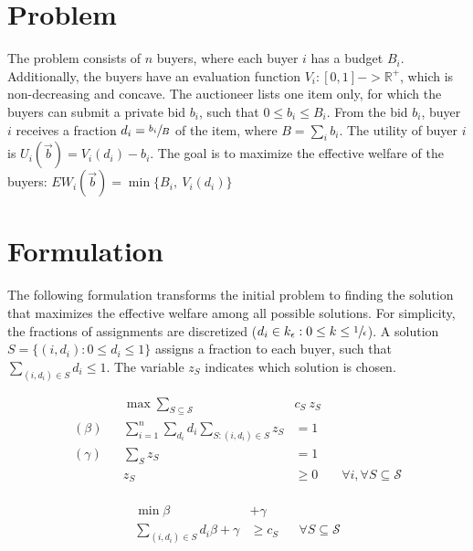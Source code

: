 \documentclass[11pt,a4paper]{article}
\begin{document}
\section{Problem}

The problem consists of $n$ buyers, where each buyer $i$ has a budget $B_i$. Additionally, the buyers have an evaluation function $V_i : [0,1] -> \mathbb{R}^+$, which is non-decreasing and concave. The auctioneer lists one item only, for which the buyers can submit a private bid $b_i$, such that $0 \le b_i \le B_i$. From the bid $b_i$, buyer $i$ receives a fraction $d_i = \sfrac{b_i}{B}$ of the item, where $B = \sum_i b_i$. The utility of buyer $i$ is $U_i(\vec{b}) = V_i(d_i) - b_i$. The goal is to maximize the effective welfare of the buyers: $EW_i(\vec{b}) = \min\{B_i,\ V_i(d_i)\}$

\section{Formulation}

The following formulation transforms the initial problem to finding the solution that maximizes the effective welfare among all possible solutions. For simplicity, the fractions of assignments are discretized ($d_i \in k_{\epsilon} : 0 \le k \le \sfrac{1}{\epsilon}$). A solution $S = \{(i, d_i) : 0 \le d_i \le 1\}$ assigns a fraction to each buyer, such that $\sum_{(i,d_{i}) \in S} d_{i} \le 1$. The variable $z_S$ indicates which solution is chosen.

\begin{minipage}[t]{0.59\textwidth}
	\begin{align*}
		&& \max  \sum_{S \subseteq \mathcal{S}} &c_{S}\ z_{S} \\
		(\beta) && \sum_{i=1}^{n} \sum_{d_{i}} d_{i} \sum_{S: (i,d_{i}) \in S } z_{S} &= 1 & & \\
		(\gamma) && \sum_{S} z_{S}  &= 1	& & \\
		&& z_{S} &\geq 0 & & \forall i, \forall S \subseteq \mathcal{S}\\
	\end{align*}
\end{minipage}
\begin{minipage}[t]{0.3\textwidth}
	\begin{align*}
		\min \beta &+ \gamma \\
		\sum_{(i,d_{i}) \in S} d_{i} \beta + \gamma &\geq c_{S}  & & \forall S \subseteq \mathcal{S}\\
\end{align*}
\end{minipage}
\end{document}
